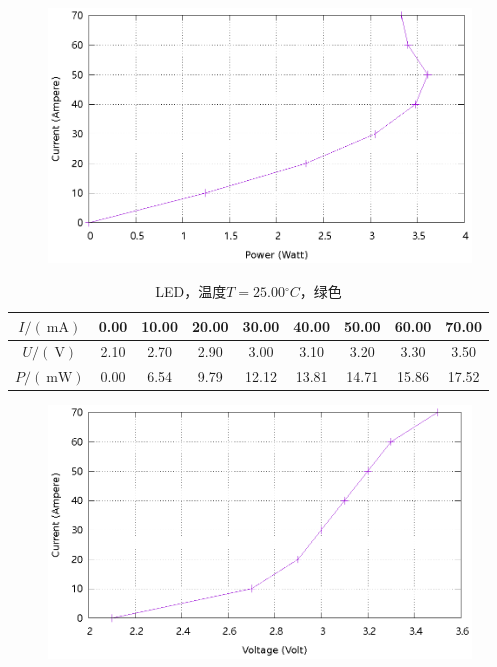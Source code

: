 \documentclass{ctexart}
\newcommand{\si}[1]{\  \mathrm{#1}}
\begin{document}
\begin{figure}[H]
    \centering
    \includegraphics[width=0.9\linewidth]{../output/led-pc-3.gnuplot}
\end{figure}
\newpage
\begin{table}[H]
    \centering
    \begin{tabular}{|c|c|c|c|c|c|c|c|c|}
        \hline
        $I/(\si{mA})$ & 0.00 & 10.00 & 20.00 & 30.00 & 40.00 & 50.00 & 60.00 & 70.00 \\\hline
        $U / (\si{V})$  & 2.10 & 2.70 & 2.90 & 3.00 & 3.10 & 3.20 & 3.30 & 3.50 \\\hline
        $P / (\si{mW})$ & 0.00 & 6.54 & 9.79 & 12.12 & 13.81 & 14.71 & 15.86 & 17.52 \\\hline
    \end{tabular}
    \caption{LED，温度$T=25.00{}^{\circ}C$，绿色}
\end{table}
\begin{figure}[H]
    \centering
    \includegraphics[width=0.9\linewidth]{../output/led-vc-4.gnuplot}
\end{figure}
\end{document}
